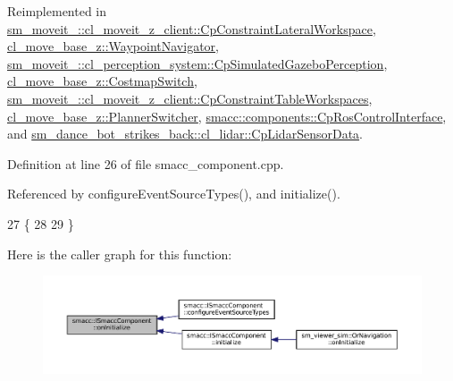 Reimplemented in \hyperlink{classsm__moveit__4_1_1cl__moveit__z__client_1_1CpConstraintLateralWorkspace_af50ccf402ab65fe3702188e5bdbcfdad}{sm\+\_\+moveit\+\_\+::cl\+\_\+moveit\+\_\+z\+\_\+client\+::\+Cp\+Constraint\+Lateral\+Workspace}, \hyperlink{classcl__move__base__z_1_1WaypointNavigator_ac60ecf63f7a2a84f3ef51f04cc222a70}{cl\+\_\+move\+\_\+base\+\_\+z\+::\+Waypoint\+Navigator}, \hyperlink{classsm__moveit__4_1_1cl__perception__system_1_1CpSimulatedGazeboPerception_adebc30f6b1fc905f783de3f7bdf4a711}{sm\+\_\+moveit\+\_\+::cl\+\_\+perception\+\_\+system\+::\+Cp\+Simulated\+Gazebo\+Perception}, \hyperlink{classcl__move__base__z_1_1CostmapSwitch_ad4d125cd563ed0bb76d27226bc47e63e}{cl\+\_\+move\+\_\+base\+\_\+z\+::\+Costmap\+Switch}, \hyperlink{classsm__moveit__4_1_1cl__moveit__z__client_1_1CpConstraintTableWorkspaces_a86292aeca8f4672617b6ea617dfb4a73}{sm\+\_\+moveit\+\_\+::cl\+\_\+moveit\+\_\+z\+\_\+client\+::\+Cp\+Constraint\+Table\+Workspaces}, \hyperlink{classcl__move__base__z_1_1PlannerSwitcher_a36bc2b9788f03a1ca02b954c625ef4c5}{cl\+\_\+move\+\_\+base\+\_\+z\+::\+Planner\+Switcher}, \hyperlink{classsmacc_1_1components_1_1CpRosControlInterface_a469bdb5723a9ab66d6b0a7908d5891bf}{smacc\+::components\+::\+Cp\+Ros\+Control\+Interface}, and \hyperlink{classsm__dance__bot__strikes__back_1_1cl__lidar_1_1CpLidarSensorData_a138dad9a855d5d4962410374d0a29d30}{sm\+\_\+dance\+\_\+bot\+\_\+strikes\+\_\+back\+::cl\+\_\+lidar\+::\+Cp\+Lidar\+Sensor\+Data}.



Definition at line 26 of file smacc\+\_\+component.\+cpp.



Referenced by configure\+Event\+Source\+Types(), and initialize().


\begin{DoxyCode}
27 \{
28 
29 \}
\end{DoxyCode}
Here is the caller graph for this function\+:
\nopagebreak
\begin{figure}[H]
\begin{center}
\leavevmode
\includegraphics[width=350pt]{classsmacc_1_1ISmaccComponent_ae6f71d008db12553912e9436184b9e65_icgraph}
\end{center}
\end{figure}
\mbox{\label{classsmacc_1_1ISmaccComponent_a687dead5b87a3b9781b9bf6ab0b7afa5}} 
